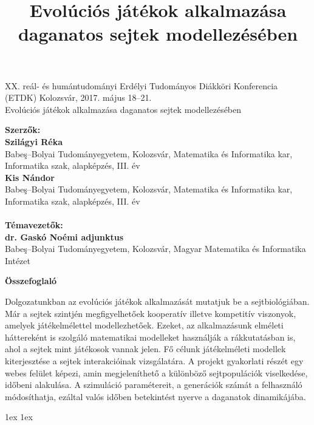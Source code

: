 \documentclass[12pt,a4paper]{ubb_dolgozat}
\title{Evolúciós játékok alkalmazása daganatos sejtek modellezésében}
\begin{document}
\newpage

\thispagestyle{empty}

\begin{center}
	XX. reál- és humántudományi Erdélyi Tudományos Diákköri Konferencia (ETDK) Kolozsvár, 2017. május 18–21.\\
	\vspace{5cm}
	{\huge Evolúciós játékok alkalmazása daganatos sejtek modellezésében}
\end{center}

\vspace{5cm}
\noindent
\textbf{Szerzők:}\\
\textbf{Szilágyi Réka}\\
Babeş–Bolyai Tudományegyetem, Kolozsvár, Matematika és Informatika kar, Informatika szak, alapképzés, III. év\\
\textbf{Kis Nándor}\\
Babeş–Bolyai Tudományegyetem, Kolozsvár, Matematika és Informatika kar, Informatika szak, alapképzés, III. év\\
\\
\textbf{Témavezetők:}\\
\textbf{dr. Gaskó Noémi adjunktus}\\
Babeş–Bolyai Tudományegyetem, Kolozsvár, Magyar Matematika és Informatika Intézet


\newpage

\setcounter{page}{1}

\begin{center}
	\textbf{Összefoglaló}
\end{center}

\vspace{3cm}
	Dolgozatunkban az evolúciós játékok alkalmazását mutatjuk be a sejtbiológiában. Már a sejtek szintjén megfigyelhetőek kooperatív illetve kompetitív viszonyok, amelyek játékelmélettel modellezhetőek. Ezeket, az alkalmazásunk elméleti háttereként is szolgáló matematikai modelleket használják a rákkutatásban is, ahol a sejtek mint játékosok vannak jelen. Fő célunk játékelméleti modellek kiterjesztése a sejtek interakcióinak vizsgálatára. A projekt gyakorlati részét egy webes felület képezi, amin megjeleníthető a különböző sejtpopulációk viselkedése, időbeni alakulása. A szimuláció paramétereit, a generációk számát a felhasználó módosíthatja, ezáltal valós időben betekintést nyerve a daganatok dinamikájába.

{ 
	\newpage
	\baselineskip 1ex
	\parskip 1ex
	\tableofcontents
}











\end{document}
